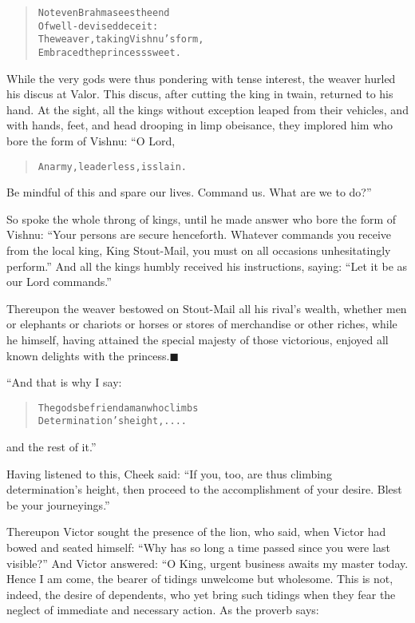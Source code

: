 \documentclass[article, twoside, 14pt]{memoir}
\newcommand{\qed}{\hfill \ensuremath{\blacksquare}}
\renewenvironment{verbatim}{%
\begin{quote}%
\vskip -10pt%
\begin{alltt}\normalfont\large}{\end{alltt}%
\end{quote}%
\vskip -10pt
} %
\begin{document}
\begin{verbatim}
Not even Brahma sees the end
    Of well-devised deceit:
The weaver, taking Vishnu's form,
    Embraced the princess sweet.
\end{verbatim}
While the very gods were thus pondering with tense interest, the
weaver hurled his discus at Valor. This discus, after cutting the
king in twain, returned to his hand. At the sight, all the kings
without exception leaped from their vehicles, and with hands, feet,
and head drooping in limp obeisance, they implored him who bore the
form of Vishnu: “O Lord,

\begin{verbatim}
An army, leaderless, is slain.
\end{verbatim}
Be mindful of this and spare our lives. Command us. What are we to
do?”

So spoke the whole throng of kings, until he made answer who bore
the form of Vishnu:
``Your persons are secure henceforth. Whatever commands you receive from the local king, King Stout-Mail, you must on all occasions unhesitatingly perform.''
And all the kings humbly received his instructions, saying:
``Let it be as our Lord commands.''

Thereupon the weaver bestowed on Stout-Mail all his rival's wealth,
whether men or elephants or chariots or horses or stores of
merchandise or other riches, while he himself, having attained the
special majesty of those victorious, enjoyed all known delights
with the princess.\hyperref[s11]{\qed}

“And that is why I say:

\begin{verbatim}
The gods befriend a man who climbs
    Determination's height, ....
\end{verbatim}
and the rest of it.”

Having listened to this, Cheek said:
``If you, too, are thus climbing determination's height, then proceed to the accomplishment of your desire. Blest be your journeyings.''

Thereupon Victor sought the presence of the lion, who said, when
Victor had bowed and seated himself:
``Why has so long a time passed since you were last visible?'' And
Victor answered: “O King, urgent business awaits my master today.
Hence I am come, the bearer of tidings unwelcome but wholesome.
This is not, indeed, the desire of dependents, who yet bring such
tidings when they fear the neglect of immediate and necessary
action. As the proverb says:
\end{document}
